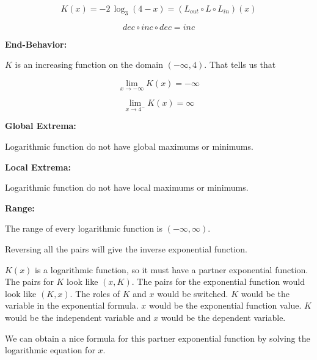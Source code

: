 \documentclass{ximera}
\begin{document}
\begin{formuala}
\begin{example}
\[ K(x) = -2 \, \log_3(4-x) = (L_{out} \circ L \circ L_{in})(x)\]


\[ dec \circ inc \circ dec = inc  \]








\textbf{End-Behavior:} 

$K$ is an increasing function on the domain $(-\infty, 4)$. That tells us that 


\[
\lim\limits_{x \to -\infty} K(x) = -\infty
\]



\[
\lim\limits_{x \to 4^-} K(x) = \infty
\]





\textbf{Global Extrema:} 

Logarithmic function do not have global maximums or minimums. 


\textbf{Local Extrema:} 

Logarithmic function do not have local maximums or minimums. 



\textbf{Range:} 

The range of every logarithmic function is $(-\infty, \infty)$.









\end{example}









Reversing all the pairs will give the inverse exponential function.  



$K(x)$ is a logarithmic function, so it must have a partner exponential function.  The pairs for $K$ look like $(x, K)$. The pairs for the exponential function would look like $(K, x)$.  The roles of $K$ and $x$ would be switched. $K$ would be the variable in the exponential formula. $x$ would be the exponential function value.  $K$ would be the independent variable and $x$ would be the dependent variable.


We can obtain a nice formula for this partner exponential function by solving the logarithmic equation for $x$.






\end{formuala}
\end{document}
